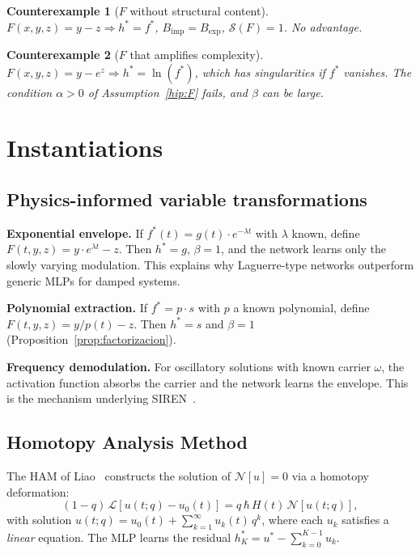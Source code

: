 \documentclass[12pt]{article}
\newtheorem{counterexample}{Counterexample}
\begin{document}
\begin{counterexample}[$F$ without structural content]
\label{ce:trivial}
$F(x,y,z) = y - z \Rightarrow h^* = f^*$,
$B_{\mathrm{imp}} = B_{\mathrm{exp}}$, $\mathcal{S}(F) = 1$.
No advantage.
\end{counterexample}

\begin{counterexample}[$F$ that amplifies complexity]
\label{ce:amplification}
$F(x,y,z) = y - e^z \Rightarrow h^* = \ln(f^*)$,
which has singularities if $f^*$ vanishes.
The condition $\alpha > 0$ of Assumption~\ref{hip:F} fails, and
$\beta$ can be large.
\end{counterexample}

\section{Instantiations}
\label{sec:instances}

\subsection{Physics-informed variable transformations}
\label{sec:variable_transform}

\textbf{Exponential envelope.}
If $f^*(t) = g(t) \cdot e^{-\lambda t}$ with $\lambda$ known,
define $F(t,y,z) = y \cdot e^{\lambda t} - z$.
Then $h^* = g$, $\beta = 1$, and the network learns only the
slowly varying modulation.
This explains why Laguerre-type networks outperform generic MLPs
for damped systems.

\textbf{Polynomial extraction.}
If $f^* = p \cdot s$ with $p$ a known polynomial, define
$F(t,y,z) = y/p(t) - z$.
Then $h^* = s$ and $\beta = 1$
(Proposition~\ref{prop:factorizacion}).

\textbf{Frequency demodulation.}
For oscillatory solutions with known carrier $\omega$,
the activation function absorbs the carrier and the network
learns the envelope.
This is the mechanism underlying SIREN~\cite{Sitzmann2020}.

\subsection{Homotopy Analysis Method}
\label{sec:ham}

The HAM of Liao~\cite{Liao2003, Liao2012} constructs the solution
of $\mathcal{N}[u] = 0$ via a homotopy deformation:
\begin{equation}
  (1-q)\,\mathcal{L}[u(t;q) - u_0(t)]
  = q\,\hbar\,H(t)\,\mathcal{N}[u(t;q)],
  \label{eq:HAM}
\end{equation}
with solution $u(t;q) = u_0(t) + \sum_{k=1}^{\infty} u_k(t)\,q^k$,
where each $u_k$ satisfies a \emph{linear} equation.
The MLP learns the residual $h^*_K = u^* - \sum_{k=0}^{K-1} u_k$.
\end{document}
